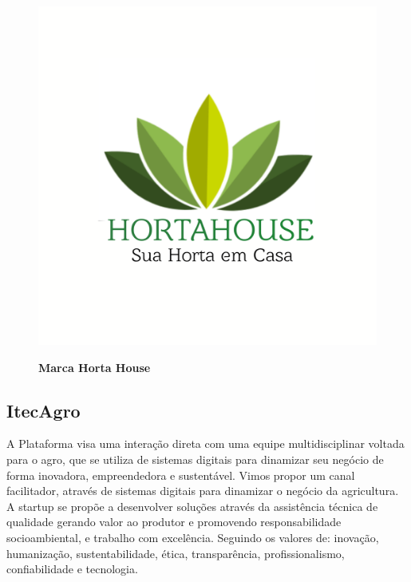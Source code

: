 \begin{figure}[H]
\centering
\caption{\textbf{Marca Horta House}}
\includegraphics[scale=0.1]{Imagens/hortahouse.png}
\label{figura_25}
\end{figure}

\subsection{ItecAgro}

A Plataforma visa uma interação direta com uma equipe multidisciplinar voltada para o agro, que se utiliza de sistemas digitais para dinamizar seu negócio de forma inovadora, empreendedora e sustentável. Vimos propor um canal facilitador, através de sistemas digitais para dinamizar o negócio da agricultura. A startup se propõe a desenvolver soluções através da assistência técnica de qualidade gerando valor ao produtor e promovendo responsabilidade socioambiental, e trabalho com excelência. Seguindo os valores de: inovação, humanização, sustentabilidade, ética, transparência, profissionalismo, confiabilidade e tecnologia.

